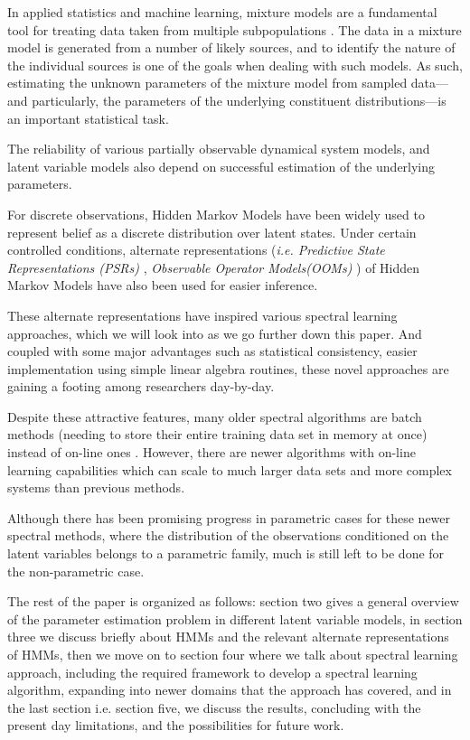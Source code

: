 In applied statistics and machine learning, mixture models are a fundamental tool for treating data taken from multiple subpopulations \cite{ref3}. The data in a mixture model is generated from a number of likely sources, and to identify the nature of the individual sources is one of the goals when dealing with such models. As such, estimating the unknown parameters of the mixture model from sampled data—and particularly, the parameters of the underlying constituent distributions—is an important statistical task. 

The reliability of various partially observable dynamical system models, and latent variable models also depend on successful estimation of the underlying parameters.

For discrete observations, Hidden Markov Models have been widely used to represent belief as a discrete distribution over latent states. Under certain controlled conditions, alternate representations (\textit{i.e. Predictive State Representations (PSRs)} \cite{ref30}, \textit{Observable Operator Models(OOMs)} \cite{ref9} ) of Hidden Markov Models have also been used for easier inference.

These alternate representations have inspired various spectral learning approaches, which we will look into as we go further down this paper. And coupled with some major advantages such as statistical consistency, easier implementation using simple linear algebra routines, these novel approaches are gaining a footing among researchers day-by-day. 

Despite these attractive features, many older spectral algorithms are batch methods (needing to store their entire training data set in memory at once) instead of on-line ones \cite{ref31}. However, there are newer algorithms with on-line learning capabilities which can scale to much larger data sets and more complex systems than previous methods.

Although there has been promising progress in parametric cases for these newer spectral methods, where the distribution of the observations conditioned on the latent variables belongs to a parametric family, much is still left to be done for the non-parametric case. 

The rest of the paper is organized as follows: section two gives a general overview of the parameter estimation problem in different latent variable models, in section three we discuss briefly about HMMs and the relevant alternate representations of HMMs, then we move on to section four where we talk about spectral learning approach, including the required framework to develop a spectral learning algorithm, expanding into newer domains that the approach has covered, and in the last section i.e. section five, we discuss the results, concluding with the present day limitations, and the possibilities for future work.   


